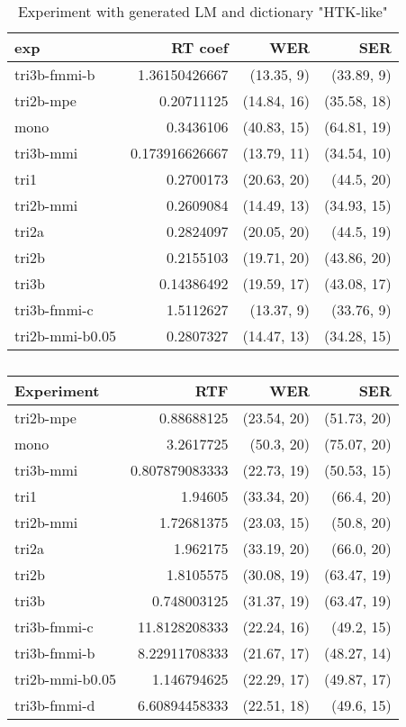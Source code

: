 \begin{table}[!htp]\label{tab:htk_like_gen_lm}\centering\begin{tabular}{l|rrr}
exp             & RT coef        & WER         & SER        \\ 
\hline
tri3b-fmmi-b    & 1.36150426667  & (13.35, 9)  & (33.89, 9) \\ 
tri2b-mpe       & 0.20711125     & (14.84, 16) & (35.58, 18)\\ 
mono            & 0.3436106      & (40.83, 15) & (64.81, 19)\\ 
tri3b-mmi       & 0.173916626667 & (13.79, 11) & (34.54, 10)\\ 
tri1            & 0.2700173      & (20.63, 20) & (44.5, 20) \\ 
tri2b-mmi       & 0.2609084      & (14.49, 13) & (34.93, 15)\\ 
tri2a           & 0.2824097      & (20.05, 20) & (44.5, 19) \\ 
tri2b           & 0.2155103      & (19.71, 20) & (43.86, 20)\\ 
tri3b           & 0.14386492     & (19.59, 17) & (43.08, 17)\\ 
tri3b-fmmi-c    & 1.5112627      & (13.37, 9)  & (33.76, 9) \\ 
tri2b-mmi-b0.05 & 0.2807327      & (14.47, 13) & (34.28, 15)\\ 
\end{tabular}
\caption{Experiment with generated LM and dictionary "\ac{HTK}-like"}
\end{table}  

\begin{table}[!htp]\label{tab:best_oov}\centering\begin{tabular}{l|rrr}
Experiment      & \ac{RTF}       & \ac{WER}         & \ac{SER} \\
\hline
tri2b-mpe       & 0.88688125     & (23.54, 20) & (51.73, 20)\\
mono            & 3.2617725      & (50.3, 20)  & (75.07, 20)\\
tri3b-mmi       & 0.807879083333 & (22.73, 19) & (50.53, 15)\\
tri1            & 1.94605        & (33.34, 20) & (66.4, 20) \\
tri2b-mmi       & 1.72681375     & (23.03, 15) & (50.8, 20) \\
tri2a           & 1.962175       & (33.19, 20) & (66.0, 20) \\
tri2b           & 1.8105575      & (30.08, 19) & (63.47, 19)\\
tri3b           & 0.748003125    & (31.37, 19) & (63.47, 19)\\
tri3b-fmmi-c    & 11.8128208333  & (22.24, 16) & (49.2, 15) \\
tri3b-fmmi-b    & 8.22911708333  & (21.67, 17) & (48.27, 14)\\
tri2b-mmi-b0.05 & 1.146794625    & (22.29, 17) & (49.87, 17)\\
tri3b-fmmi-d    & 6.60894458333  & (22.51, 18) & (49.6, 15)
\end{tabular}
\caption{}
\end{table}  


